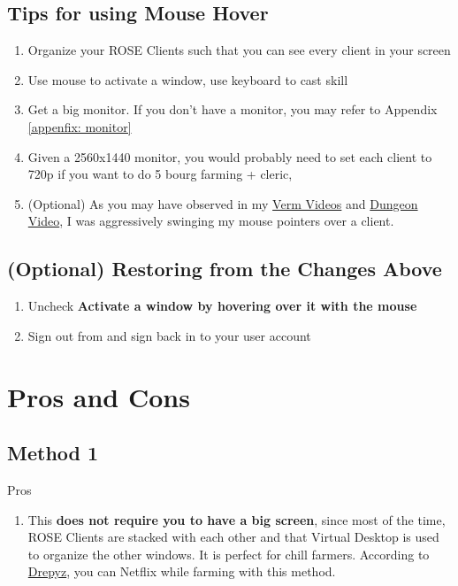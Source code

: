 \documentclass{article}
\begin{document}
\subsection{Tips for using Mouse Hover}

\begin{enumerate}
   \item Organize your ROSE Clients such that you can see every client in your screen
   \item Use mouse to activate a window, use keyboard to cast skill
   \item Get a big monitor. If you don't have a monitor, you may refer to Appendix \ref{appenfix: monitor}
   \item Given a 2560x1440 monitor, you would probably need to set each client to 720p if you want to do 5 bourg farming + cleric,
   \item (Optional) As you may have observed in my \href{https://www.youtube.com/watch?v=-E__d2IBEM0&list=PLVUbtDqG7l80M84sE1TMZNl3Agw9TTmLQ&index=2&t=0s}{Verm Videos} and \href{https://www.youtube.com/watch?v=vq8f05UDmdI}{Dungeon Video}, I was aggressively swinging my mouse pointers over a client. 
\end{enumerate}

\subsection{(Optional) Restoring from the Changes Above}
\begin{enumerate}
   \item Uncheck \textbf{Activate a window by hovering over it with the mouse}
   \item Sign out from and sign back in to your user account
\end{enumerate}


\section{Pros and Cons}

\subsection{Method 1}
   \item Pros
   \begin{enumerate}
     \item  This \textbf{does not require you to have a big screen}, since most of the time, ROSE Clients are stacked with each other and that Virtual Desktop is used to organize the other windows. It is perfect for chill farmers. According to \href{https://forum.aruarose.com/members/drepyz.5832/}{Drepyz}, you can Netflix while farming with this method.
   \end{enumerate}
   
\end{document}

